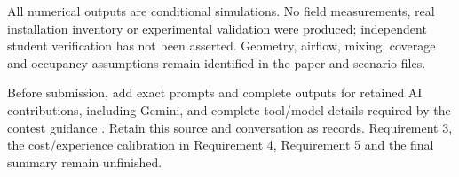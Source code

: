 \documentclass[12pt]{article}
\begin{document}
All numerical outputs are conditional simulations. No field measurements, real installation inventory or experimental validation were produced; independent student verification has not been asserted. Geometry, airflow, mixing, coverage and occupancy assumptions remain identified in the paper and scenario files.

Before submission, add exact prompts and complete outputs for retained AI contributions, including Gemini, and complete tool/model details required by the contest guidance \cite{aipolicy}. Retain this source and conversation as records. Requirement 3, the cost/experience calibration in Requirement 4, Requirement 5 and the final summary remain unfinished.
\end{document}
